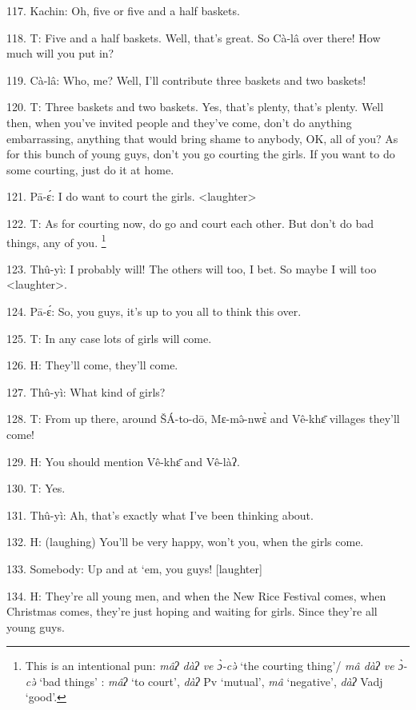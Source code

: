117. Kachin: Oh, five or five and a half baskets.

118. T: Five and a half baskets.  Well, that's great.  So Cà-lâ over there!
How much will you put in?

119. Cà-lâ: Who, me?  Well, I'll contribute three baskets\textit{ }and two baskets!

120. T: Three baskets\textit{ }and two baskets.  Yes, that's plenty, that's plenty.
Well then, when you've invited people and they've come, don't do anything embarrassing,
anything that would bring shame to anybody, OK, all of you?  As for this bunch
of young guys, don't you go courting the girls.  If you want to do some courting,
just do it at home.

121. Pā-ɛ́: I do want to court the girls. <laughter>

122. T: As for courting now, do go and court each other.  But don't do bad things,
any of you. \footnote{This is an intentional pun: \textit{mâʔ dàʔ ve ɔ̀-cə̀} `the courting thing'/ \textit{mâ dàʔ ve ɔ̀-cə̀} `bad things' : \textit{mâʔ }`to court', \textit{dàʔ} Pv `mutual',\textit{ mâ} `negative', \textit{dàʔ }Vadj `good'.}

123. Thû-yì: I probably will!  The others will too, I bet.  So maybe I will too
<laughter>.

124. Pā-ɛ́: So, you guys, it's up to you all to think this over.

125. T: In any case lots of girls will come.

126. H: They'll come, they'll come.

127. Thû-yì: What kind of girls?

128. T: From up there, around ŠÁ-to-dō, Mɛ-mə̂-nwɛ̀ and Vê-khɛ̄ villages
they'll come!

129. H: You should mention Vê-khɛ̄ and Vê-làʔ.

130. T: Yes.

131. Thû-yì: Ah, that's exactly what I've been thinking about.

132. H: (laughing) You'll be very happy, won't you, when the girls come.

133. Somebody: Up and at `em, you guys! [laughter]

134. H: They're all young men, and when the New Rice Festival comes, when Christmas
comes, they're just hoping and waiting for girls.  Since they're all young guys.
